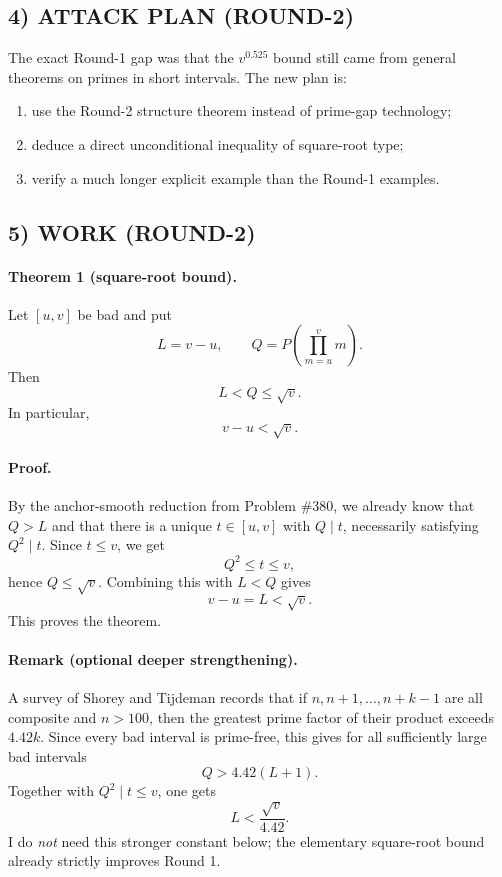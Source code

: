\subsection*{4) ATTACK PLAN (ROUND-2)}

The exact Round-1 gap was that the $v^{0.525}$ bound still came from general theorems on primes in short intervals. The new plan is:

\begin{enumerate}
\item use the Round-2 structure theorem instead of prime-gap technology;
\item deduce a direct unconditional inequality of square-root type;
\item verify a much longer explicit example than the Round-1 examples.
\end{enumerate}

\subsection*{5) WORK (ROUND-2)}

\paragraph{Theorem 1 (square-root bound).}
Let $[u,v]$ be bad and put
\[
L=v-u,\qquad Q=P\!\left(\prod_{m=u}^{v}m\right).
\]
Then
\[
L<Q\le \sqrt{v}.
\]
In particular,
\[
v-u<\sqrt{v}.
\]

\paragraph{Proof.}
By the anchor-smooth reduction from Problem \#380, we already know that $Q>L$ and that there is a unique $t\in [u,v]$ with $Q\mid t$, necessarily satisfying $Q^2\mid t$. Since $t\le v$, we get
\[
Q^2\le t\le v,
\]
hence $Q\le \sqrt{v}$. Combining this with $L<Q$ gives
\[
v-u=L<\sqrt{v}.
\]
This proves the theorem.

\paragraph{Remark (optional deeper strengthening).}
A survey of Shorey and Tijdeman records that if $n,n+1,\dots,n+k-1$ are all composite and $n>100$, then the greatest prime factor of their product exceeds $4.42k$. Since every bad interval is prime-free, this gives for all sufficiently large bad intervals
\[
Q>4.42(L+1).
\]
Together with $Q^2\mid t\le v$, one gets
\[
L<\frac{\sqrt{v}}{4.42}.
\]
I do \emph{not} need this stronger constant below; the elementary square-root bound already strictly improves Round 1.

